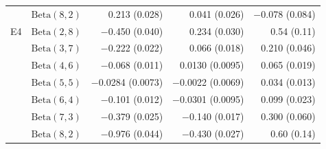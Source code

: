 \begin{tabular}{llrrr}
 & $\mathrm{Beta}(8,2)$ & 0.213 (0.028) & 0.041 (0.026) & $-$0.078 (0.084) \\[3pt]
E4 & $\mathrm{Beta}(2,8)$ & $-$0.450 (0.040) & 0.234 (0.030) & 0.54 (0.11) \\
 & $\mathrm{Beta}(3,7)$ & $-$0.222 (0.022) & 0.066 (0.018) & 0.210 (0.046) \\
 & $\mathrm{Beta}(4,6)$ & $-$0.068 (0.011) & 0.0130 (0.0095) & 0.065 (0.019) \\
 & $\mathrm{Beta}(5,5)$ & $-$0.0284 (0.0073) & $-$0.0022 (0.0069) & 0.034 (0.013) \\
 & $\mathrm{Beta}(6,4)$ & $-$0.101 (0.012) & $-$0.0301 (0.0095) & 0.099 (0.023) \\
 & $\mathrm{Beta}(7,3)$ & $-$0.379 (0.025) & $-$0.140 (0.017) & 0.300 (0.060) \\
 & $\mathrm{Beta}(8,2)$ & $-$0.976 (0.044) & $-$0.430 (0.027) & 0.60 (0.14) \\
\hline
\end{tabular}
